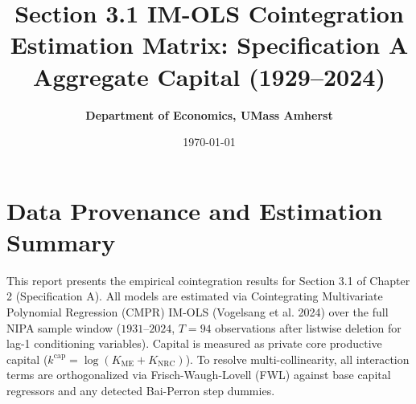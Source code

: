 \documentclass[11pt,a4paper]{article}
\title{\textbf{Section 3.1 IM-OLS Cointegration Estimation Matrix: Specification A Aggregate Capital (1929--2024)}}
\author{\textbf{Department of Economics, UMass Amherst}}
\date{\today}
\begin{document}
\maketitle

\section*{Data Provenance and Estimation Summary}
This report presents the empirical cointegration results for Section 3.1 of Chapter 2 (Specification A). All models are estimated via Cointegrating Multivariate Polynomial Regression (CMPR) IM-OLS (Vogelsang et al. 2024) over the full NIPA sample window ($1931$--$2024$, $T=94$ observations after listwise deletion for lag-1 conditioning variables). Capital is measured as private core productive capital ($k^{\text{cap}} = \log(K_{\text{ME}} + K_{\text{NRC}})$). To resolve multi-collinearity, all interaction terms are orthogonalized via Frisch-Waugh-Lovell (FWL) against base capital regressors and any detected Bai-Perron step dummies.
\end{document}
